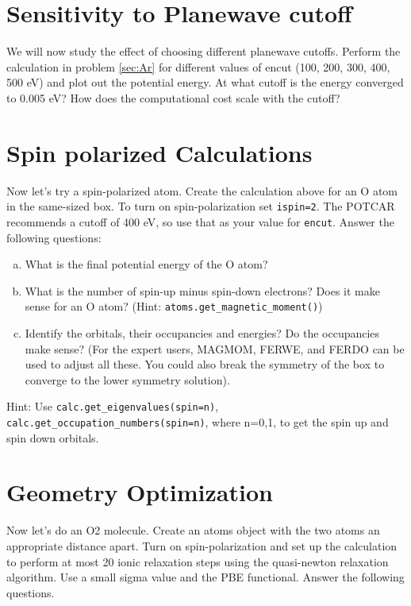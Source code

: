 \documentclass[11pt]{article}
\begin{document}
\section{Sensitivity to Planewave cutoff}
\label{sec-2}

We will now study the effect of choosing different planewave cutoffs. Perform the calculation in problem \ref{sec:Ar} for different values of encut (100, 200, 300, 400, 500 eV) and plot out the potential energy. At what cutoff is the energy converged to 0.005 eV? How does the computational cost scale with the cutoff?


\section{Spin polarized Calculations}
\label{sec-3}

Now let’s try a spin-polarized atom. Create the calculation above for an O atom in the same-sized box. To turn on spin-polarization set \verb~ispin=2~. The POTCAR recommends a cutoff of 400 eV, so use that as your value for \verb~encut~. Answer the following questions:

\begin{enumerate}[(a)]
\item What is the final potential energy of the O atom?

\item What is the number of spin-up minus spin-down electrons? Does it make sense for an O atom? (Hint: \verb~atoms.get_magnetic_moment()~)

\item Identify the orbitals, their occupancies and energies? Do the occupancies make sense? (For the expert users, MAGMOM, FERWE, and FERDO can be used to adjust all these. You could also break the symmetry of the box to converge to the lower symmetry solution).
\end{enumerate}

Hint: Use \verb~calc.get_eigenvalues(spin=n)~, \verb~calc.get_occupation_numbers(spin=n)~, where n=0,1, to get the spin up and spin down orbitals.

\section{Geometry Optimization}
\label{sec-4}

Now let’s do an O2 molecule. Create an atoms object with the two atoms an appropriate distance apart. Turn on spin-polarization and set up the calculation to perform at most 20 ionic relaxation steps using the quasi-newton relaxation algorithm. Use a small sigma value and the PBE functional. Answer the following questions.
\end{document}
